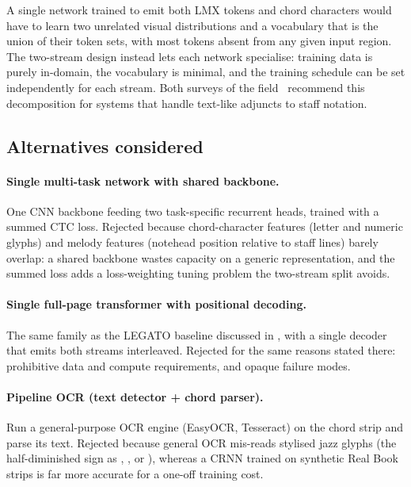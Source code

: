 A single network trained to emit both LMX tokens and chord characters
would have to learn two unrelated visual distributions and a vocabulary
that is the union of their token sets, with most tokens absent from any
given input region.
The two-stream design instead lets each network specialise: training
data is purely in-domain, the vocabulary is minimal, and the training
schedule can be set independently for each stream.
Both surveys of the
field~\cite{calvoZaragozaUnderstandingOMR2020,shatriOPTICALMUSICRECOGNITION}
recommend this decomposition for systems that handle text-like
adjuncts to staff notation.

\subsection{Alternatives considered}
\label{sec:design-twostream-alts}

\paragraph{Single multi-task network with shared backbone.}
One CNN backbone feeding two task-specific recurrent heads, trained
with a summed CTC loss. Rejected because chord-character features (letter
and numeric glyphs) and melody features (notehead position relative to
staff lines) barely overlap: a shared backbone wastes capacity on a
generic representation, and the summed loss adds a loss-weighting
tuning problem the two-stream split avoids.

\paragraph{Single full-page transformer with positional decoding.}
The same family as the LEGATO baseline discussed in
, with a single decoder that emits both
streams interleaved.  Rejected for the same reasons stated there:
prohibitive data and compute requirements, and opaque failure modes.

\paragraph{Pipeline OCR (text detector + chord parser).}
Run a general-purpose OCR engine (EasyOCR, Tesseract) on the chord
strip and parse its text. Rejected because general OCR mis-reads
stylised jazz glyphs (the  half-diminished sign as
, , or ), whereas a CRNN trained on synthetic
Real Book strips is far more accurate for a one-off training cost.

